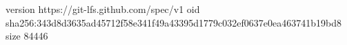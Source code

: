version https://git-lfs.github.com/spec/v1
oid sha256:343d8d3635ad45712f58e341f49a43395d1779c032ef0637e0ea463741b19bd8
size 84446
